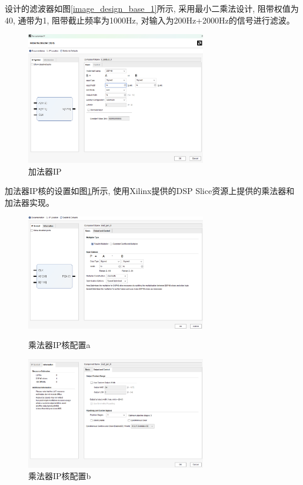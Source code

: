 \documentclass{article}
\begin{document}
设计的滤波器如图\ref{image_design_base_1}所示, 采用最小二乘法设计, 阻带权值为40, 通带为1, 
阻带截止频率为1000Hz, 对输入为200Hz+2000Hz的信号进行滤波。
\begin{figure}[H]
    \centering
    \includegraphics[width=0.7\textwidth]{image/2024-06-26-15-56-44.png}
    \caption{加法器IP}
    \label{image_design_base_2}
\end{figure}
加法器IP核的设置如图\ref{image_design_base_2}所示, 使用Xilinx提供的DSP Slice资源上提供的乘法器和加法器实现。
\begin{figure}[H]
    \begin{minipage}[t]{0.45\linewidth}
        \centering
        \includegraphics[width=0.7\textwidth]{image/2024-06-26-16-09-08.png}
        \caption{乘法器IP核配置a}
        \label{image_design_base_3_1}
    \end{minipage}
    \begin{minipage}[t]{0.45\linewidth}
        \centering
        \includegraphics[width=0.7\textwidth]{image/2024-06-26-16-11-08.png}
        \caption{乘法器IP核配置b}
        \label{image_design_base_3_2}
    \end{minipage}
\end{figure}
\end{document}
